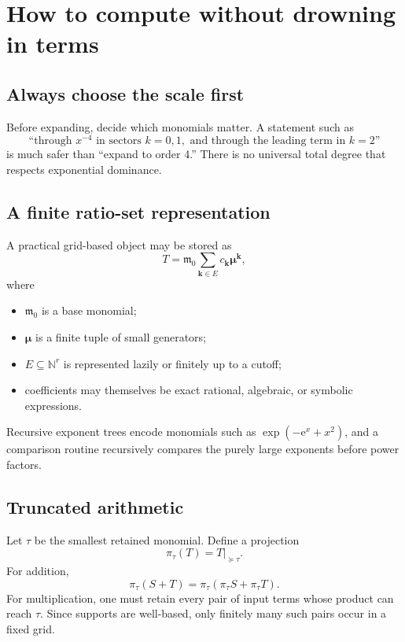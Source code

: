 \documentclass[11pt,oneside]{book}
\theoremstyle{definition}
\theoremstyle{remark}
\newcommand{\N}{\mathbb{N}}
\newcommand{\m}{\mathfrak{m}}
\newcommand{\e}{\mathrm{e}}
\newcommand{\succsimdom}{\succcurlyeq}
\begin{document}
\chapter{How to compute without drowning in terms}
\label{ch:computation}

\section{Always choose the scale first}

Before expanding, decide which monomials matter. A statement such as
\[
  \text{``through }x^{-4}\text{ in sectors }k=0,1,
  \text{ and through the leading term in }k=2\text{''}
\]
is much safer than ``expand to order 4.'' There is no universal total degree
that respects exponential dominance.

\section{A finite ratio-set representation}

A practical grid-based object may be stored as
\[
  T=\m_0\sum_{\bm k\in E}c_{\bm k}\boldsymbol\mu^{\bm k},
\]
where
\begin{itemize}
\item $\m_0$ is a base monomial;
\item $\boldsymbol\mu$ is a finite tuple of small generators;
\item $E\subseteq\N^r$ is represented lazily or finitely up to a cutoff;
\item coefficients may themselves be exact rational, algebraic, or symbolic
      expressions.
\end{itemize}

Recursive exponent trees encode monomials such as
$\exp(-\e^x+x^2)$, and a comparison routine recursively compares the purely
large exponents before power factors.

\section{Truncated arithmetic}

Let $\tau$ be the smallest retained monomial. Define a projection
\[
  \pi_{\tau}(T)=T\big|_{\succsimdom\tau}.
\]
For addition,
\[
  \pi_\tau(S+T)=\pi_\tau(\pi_\tau S+\pi_\tau T).
\]
For multiplication, one must retain every pair of input terms whose product can
reach $\tau$. Since supports are well-based, only finitely many such pairs occur
in a fixed grid.
\end{document}
